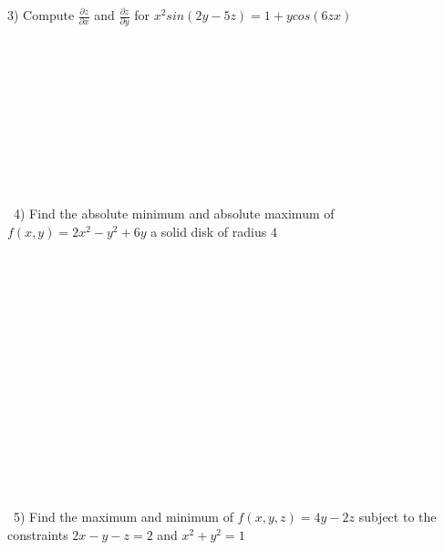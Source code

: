 \documentclass[12pt]{article}
\begin{document}
3) Compute $\frac{\partial z}{\partial x}$ and $\frac{\partial z}{\partial y}$ for $x^2sin(2y-5z) = 1+ycos(6zx)$
\\\\\\\\\\\\\\\\\\\\\\\
4) Find the absolute minimum and absolute maximum of $f(x,y) = 2x^2 - y^2 + 6y$ a solid disk of radius $4$
\\\\\\\\\\\\\\\\\\\\\\\\\\\\\\\\\
5) Find the maximum and minimum of $f(x,y,z) = 4y-2z$ subject to the constraints $2x-y-z=2$ and $x^2 + y^2 = 1$
 
\end{document}
